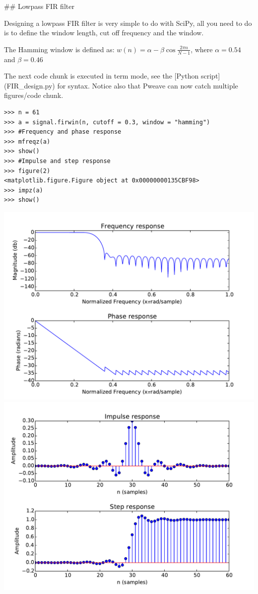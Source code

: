 ## Lowpass FIR filter

Designing a lowpass FIR filter is very simple to do with SciPy, all you
need to do is to define the window length, cut off frequency and the
window.

The Hamming window is defined as:
$w(n) = \alpha - \beta\cos\frac{2\pi n}{N-1}$, where $\alpha=0.54$ and $\beta=0.46$ 

The next code chunk is executed in term mode, see the [Python script](FIR_design.py) for syntax.
Notice also that Pweave can now catch multiple figures/code chunk.



\begin{verbatim}
>>> n = 61
>>> a = signal.firwin(n, cutoff = 0.3, window = "hamming")
>>> #Frequency and phase response
>>> mfreqz(a)
>>> show()
>>> #Impulse and step response
>>> figure(2)
<matplotlib.figure.Figure object at 0x00000000135CBF98>
>>> impz(a)
>>> show()

\end{verbatim}
\includegraphics[width= \linewidth]{figures/untiled2_figure2_1.pdf}
\includegraphics[width= \linewidth]{figures/untiled2_figure2_2.pdf}


